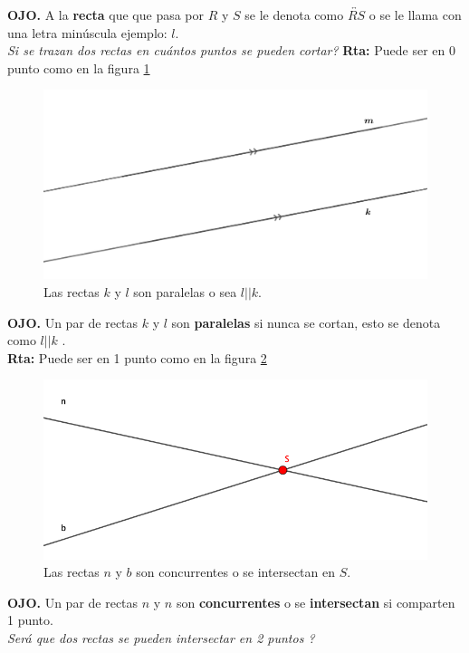 \textbf{OJO. } A la \textbf{recta} que que pasa por $R$ y $S$ se le denota como $\overleftrightarrow{RS}$ o se le llama con una letra minúscula ejemplo: $l$.\\

\textit{Si se trazan dos rectas en cuántos puntos se pueden cortar?} \textbf{Rta: }Puede ser en 0 punto como en la figura \ref{paralelas}

\begin{figure}[H]
	\centering
	\includegraphics[width=0.7\linewidth]{Geometria/imgs/paralelas}
	\caption{Las rectas $k$ y $l$ son paralelas o sea $l||k$.}
	\label{paralelas}
\end{figure}

\textbf{OJO. }Un par de rectas $k$ y $l$ son \textbf{paralelas} si nunca se cortan, esto se denota como $l||k$ .\\

\textbf{Rta: }Puede ser en 1 punto como en la figura \ref{concurrentes}

\begin{figure}[H]
	\centering
	\includegraphics[width=0.85\linewidth]{Geometria/imgs/concurrentes}
	\caption{Las rectas $n$ y $b$ son concurrentes o se intersectan en $S$.}
	\label{concurrentes}
\end{figure}

\textbf{OJO. }Un par de rectas $n$ y $n$ son \textbf{concurrentes} o se \textbf{intersectan} si comparten 1 punto.\\

\textit{Será que dos rectas se pueden intersectar en 2 puntos ?}

